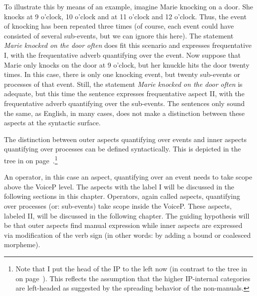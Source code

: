 To illustrate this by means of an example, imagine Marie knocking on a door. She knocks at 9 o'clock, 10 o'clock and at 11 o'clock and 12 o'clock. Thus, the event of knocking has been repeated three times (of course, each event could have consisted of several sub-events, but we can ignore this here). The statement \textit{Marie knocked on the door often} does fit this scenario and expresses frequentative I, with the frequentative adverb quantifying over the event. Now suppose that Marie only knocks on the door at 9 o'clock, but her knuckle hits the door twenty times. In this case, there is only one knocking event, but twenty sub-events or processes of that event. Still, the statement \textit{Marie knocked on the door often} is adequate, but this time the sentence expresses frequentative aspect II, with the frequentative adverb quantifying over the sub-events. The sentences only sound the same, as English, in many cases, does not make a distinction between these aspects at the syntactic surface. 

The distinction between outer aspects quantifying over events and inner aspects quantifying over processes can be defined syntactically. This is depicted in the tree in  on page~\pageref{treeoverviestwo}.\footnote{Note that I put the head of the IP to the left now (in contrast to the tree in  on page~\pageref{treeovervies}). This reflects the assumption that the higher IP-internal categories are left-headed as suggested by the spreading behavior of the non-manuals.} 

An operator, in this case an aspect, quantifying over an event needs to take scope above the VoiceP level. The aspects with the label I will be discussed in the following sections in this chapter. Operators, again called aspects, quantifying over processes (or: sub-events) take scope inside the VoiceP. These aspects, labeled II, will be discussed in the following chapter. The guiding hypothesis will be that outer aspects find manual expression while inner aspects are expressed via modification of the verb sign (in other words: by adding a bound or coalesced morpheme). 

